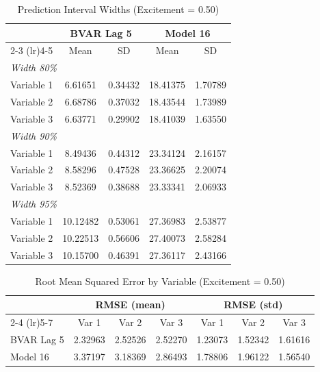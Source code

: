 \begin{table}[htbp]
\centering
\caption{Prediction Interval Widths (Excitement = 0.50)}
\label{tab:width_0p50}
\begin{tabular}{lcccc}
\toprule
 & \multicolumn{2}{c}{BVAR Lag 5} & \multicolumn{2}{c}{Model 16} \\
\cmidrule(lr){2-3} \cmidrule(lr){4-5}
 & Mean & SD & Mean & SD \\
\midrule
\multicolumn{5}{l}{\textit{Width 80\%}} \\
Variable 1 & 6.61651 & 0.34432 & 18.41375 & 1.70789 \\
Variable 2 & 6.68786 & 0.37032 & 18.43544 & 1.73989 \\
Variable 3 & 6.63771 & 0.29902 & 18.41039 & 1.63550 \\
\multicolumn{5}{l}{\textit{Width 90\%}} \\
Variable 1 & 8.49436 & 0.44312 & 23.34124 & 2.16157 \\
Variable 2 & 8.58296 & 0.47528 & 23.36625 & 2.20074 \\
Variable 3 & 8.52369 & 0.38688 & 23.33341 & 2.06933 \\
\multicolumn{5}{l}{\textit{Width 95\%}} \\
Variable 1 & 10.12482 & 0.53061 & 27.36983 & 2.53877 \\
Variable 2 & 10.22513 & 0.56606 & 27.40073 & 2.58284 \\
Variable 3 & 10.15700 & 0.46391 & 27.36117 & 2.43166 \\
\bottomrule
\end{tabular}
\end{table}

\begin{table}[htbp]
\centering
\caption{Root Mean Squared Error by Variable (Excitement = 0.50)}
\label{tab:rmse_0p50}
\begin{tabular}{lcccccc}
\toprule
 & \multicolumn{3}{c}{RMSE (mean)} & \multicolumn{3}{c}{RMSE (std)} \\
\cmidrule(lr){2-4} \cmidrule(lr){5-7}
 & Var 1 & Var 2 & Var 3 & Var 1 & Var 2 & Var 3 \\
\midrule
BVAR Lag 5 & 2.32963 & 2.52526 & 2.52270 & 1.23073 & 1.52342 & 1.61616 \\
Model 16 & 3.37197 & 3.18369 & 2.86493 & 1.78806 & 1.96122 & 1.56540 \\
\bottomrule
\end{tabular}
\end{table}


